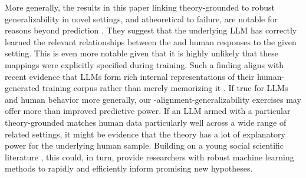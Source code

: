 More generally, the results in this paper linking theory-grounded  to robust generalizability in novel settings, and atheoretical  to failure, are notable for reasons beyond prediction \citep{hofman2021integrating}.
They suggest that the underlying LLM has correctly learned the relevant relationships between the  and human responses to the given setting.
This is even more notable given that it is highly unlikely that these mappings were explicitly specified during training.  
Such a finding aligns with recent evidence that LLMs form rich internal representations of their human-generated training corpus rather than merely memorizing it \citep{lindsey2025biology, ameisen2025circuit}.
If true for LLMs and human behavior more generally, our \persona{}-alignment-generalizability exercises may offer more than improved predictive power.
If an LLM armed with a particular theory-grounded \persona{} matches human data particularly well across a wide range of related settings, it might be evidence that the theory has a lot of explanatory power for the underlying human sample.
Building on a young social scientific literature \citep{peterson2021lottery,hirasawa2022using,EnkeComplexity2023,Si2024NovelResearch,MLhypothesis2024,Ashesh2024Anomaly,batista2024words,movva2025sparse}, this could, in turn, provide researchers with robust machine learning methods to rapidly and efficiently inform promising new hypotheses.

\newpage \clearpage




\newpage \clearpage

\appendix

\renewcommand{\thefigure}{A\arabic{figure}} 
\setcounter{figure}{0}  

\renewcommand{\thetable}{A\arabic{table}} 
\setcounter{table}{0}  

